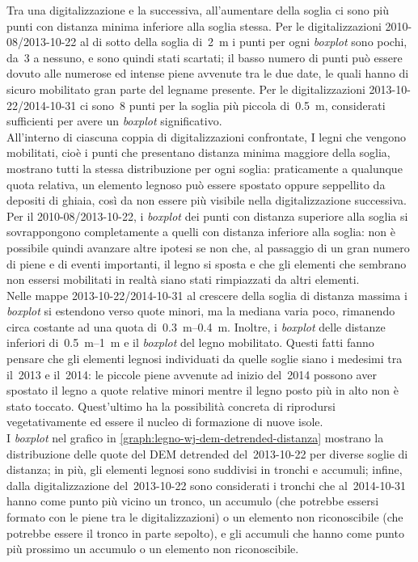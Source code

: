 Tra una digitalizzazione e la successiva, all'aumentare della soglia ci sono più punti con distanza minima inferiore alla soglia stessa.
Per le digitalizzazioni 2010-08/2013-10-22 al di sotto della soglia di~\SI{2}{\m} i punti per ogni \emph{boxplot} sono pochi, da~3 a nessuno, e sono quindi stati scartati; il basso numero di punti può essere dovuto alle numerose ed intense piene avvenute tra le due date, le quali hanno di sicuro mobilitato gran parte del legname presente.
Per le digitalizzazioni 2013-10-22/2014-10-31 ci sono~8 punti per la soglia più piccola di~\SI{0.5}{\m}, considerati sufficienti per avere un \emph{boxplot} significativo.
\\
All'interno di ciascuna coppia di digitalizzazioni confrontate, I legni che vengono mobilitati, cioè i punti che presentano distanza minima maggiore della soglia, mostrano tutti la stessa distribuzione per ogni soglia: praticamente a qualunque quota relativa, un elemento legnoso può essere spostato oppure seppellito da depositi di ghiaia, così da non essere più visibile nella digitalizzazione successiva.
\\
Per il 2010-08/2013-10-22, i \emph{boxplot} dei punti con distanza superiore alla soglia si sovrappongono completamente a quelli con distanza inferiore alla soglia: non è possibile quindi avanzare altre ipotesi se non che, al passaggio di un gran numero di piene e di eventi importanti, il legno si sposta e che gli elementi che sembrano non essersi mobilitati in realtà siano stati rimpiazzati da altri elementi.
\\
Nelle mappe 2013-10-22/2014-10-31 al crescere della soglia di distanza massima i \emph{boxplot} si estendono verso quote minori, ma la mediana varia poco, rimanendo circa costante ad una quota di~\SIrange[range-phrase = {-}, range-units = single]{0.3}{0.4}{\m}.
Inoltre, i \emph{boxplot} delle distanze inferiori di~\SIrange[range-phrase = { e }]{0.5}{1}{\m} e il \emph{boxplot} del legno mobilitato.
Questi fatti fanno pensare che gli elementi legnosi individuati da quelle soglie siano i medesimi tra il~2013 e il~2014: le piccole piene avvenute ad inizio del~2014 possono aver spostato il legno a quote relative minori mentre il legno posto più in alto non è stato toccato.
Quest'ultimo ha la possibilità concreta di riprodursi vegetativamente ed essere il nucleo di formazione di nuove isole.
\\
I \emph{boxplot} nel grafico in \cref{graph:legno-wj-dem-detrended-distanza} mostrano la distribuzione delle quote del DEM detrended del~2013-10-22 per diverse soglie di distanza; in più, gli elementi legnosi sono suddivisi in tronchi e accumuli; infine, dalla digitalizzazione del~2013-10-22 sono considerati i tronchi che al~2014-10-31 hanno come punto più vicino un tronco, un accumulo (che potrebbe essersi formato con le piene tra le digitalizzazioni) o un elemento non riconoscibile (che potrebbe essere il tronco in parte sepolto), e gli accumuli che hanno come punto più prossimo un accumulo o un elemento non riconoscibile.
